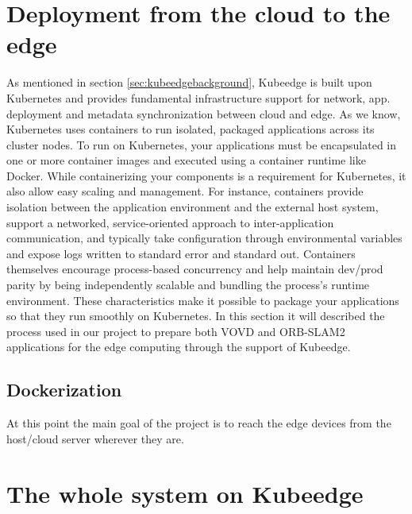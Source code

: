 \section{Deployment from the cloud to the edge} %
As mentioned in section \ref{sec:kubeedgebackground}, Kubeedge is built upon Kubernetes and provides fundamental infrastructure support for network, app. deployment and metadata synchronization between cloud and edge. As we know, Kubernetes uses containers to run isolated, packaged applications across its cluster nodes. To run on Kubernetes, your applications must be encapsulated in one or more container images and executed using a container runtime like Docker. While containerizing your components is a requirement for Kubernetes, it also allow easy scaling and management. For instance, containers provide isolation between the application environment and the external host system, support a networked, service-oriented approach to inter-application communication, and typically take configuration through environmental variables and expose logs written to standard error and standard out. Containers themselves encourage process-based concurrency and help maintain dev/prod parity by being independently scalable and bundling the process’s runtime environment. These characteristics make it possible to package your applications so that they run smoothly on Kubernetes.
In this section it will described the process used in our project to prepare both VOVD and ORB-SLAM2 applications for the edge computing through the support of Kubeedge.


\subsection{Dockerization}
At this point the main goal of the project is to reach the edge devices from the host/cloud server wherever they are.




\section{The whole system on Kubeedge}



